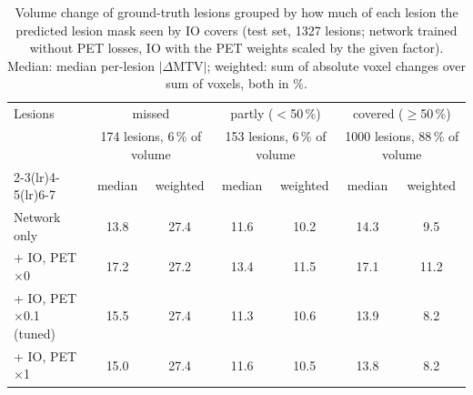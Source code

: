 \begin{table}[t]
\centering
\caption{Volume change of ground-truth lesions grouped by how much of each lesion the predicted lesion mask seen by IO covers (test set, 1327 lesions; network trained without PET losses, IO with the PET weights scaled by the given factor). Median: median per-lesion $|\Delta\mathrm{MTV}|$; weighted: sum of absolute voxel changes over sum of voxels, both in \%.}
\label{tab:detection}
\scriptsize
\setlength{\tabcolsep}{4pt}
\begin{tabular}{lcccccc}
\toprule
Lesions & \multicolumn{2}{c}{missed} & \multicolumn{2}{c}{partly ($<$50\,\%)} & \multicolumn{2}{c}{covered ($\geq$50\,\%)} \\
 & \multicolumn{2}{c}{\tiny 174 lesions, 6\,\% of volume} & \multicolumn{2}{c}{\tiny 153 lesions, 6\,\% of volume} & \multicolumn{2}{c}{\tiny 1000 lesions, 88\,\% of volume} \\
\cmidrule(lr){2-3}\cmidrule(lr){4-5}\cmidrule(lr){6-7}
 & median & weighted & median & weighted & median & weighted \\
\midrule
Network only & 13.8 & 27.4 & 11.6 & 10.2 & 14.3 & 9.5 \\
\midrule
+ IO, PET $\times$0 & 17.2 & 27.2 & 13.4 & 11.5 & 17.1 & 11.2 \\
+ IO, PET $\times$0.1 (tuned) & 15.5 & 27.4 & 11.3 & 10.6 & 13.9 & 8.2 \\
+ IO, PET $\times$1 & 15.0 & 27.4 & 11.6 & 10.5 & 13.8 & 8.2 \\
\bottomrule
\end{tabular}
\end{table}
